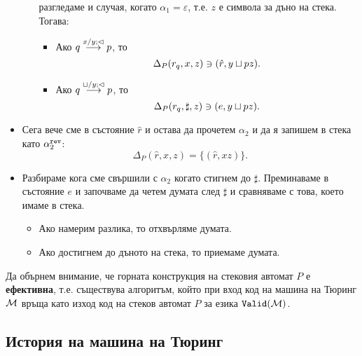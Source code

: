 \begin{hint}
\begin{itemize}
\begin{itemize}
      разгледаме и случая, когато $\alpha_1 = \varepsilon$, т.е. $z$ е символа за дъно на стека. Тогава:
      \begin{itemize}
      \item
        Ако $q \overset{x/y;\lhd}{\longrightarrow} p$, то
        \[\Delta_{P}(r_q,x,z) \ni (\hat{r},y\sqcup pz).\]
      \item
        Ако $q \overset{\sqcup/y;\lhd}{\longrightarrow} p$, то
        \[\Delta_{P}(r_q,\sharp,z) \ni (e,y\sqcup pz).\]
      \end{itemize}
    \end{itemize}
  \item
    Сега вече сме в състояние $\hat{r}$ и остава да прочетем $\alpha_2$ и да я запишем в стека като $\alpha^{\texttt{rev}}_2$:
    \[\Delta_{P}(\hat{r},x,z) = \{(\hat{r}, xz)\}.\]
  \item
    Разбираме кога сме свършили с $\alpha_2$ когато стигнем до $\sharp$. Преминаваме в състояние $e$ и
    започваме да четем думата след $\sharp$ и сравняваме с това, което имаме в стека.
    \begin{itemize}
    \item
      Ако намерим разлика, то отхвърляме думата.
    \item
      Ако достигнем до дъното на стека, то приемаме думата.
    \end{itemize}
  \end{itemize}
\end{hint}

\begin{remark}
  Да обърнем внимание, че горната конструкция на стековия автомат $P$ е {\bf ефективна}, т.е.
  съществува алгоритъм, който при вход код на машина на Тюринг $\mathcal{M}$ връща като изход код на стеков автомат $P$ за езика $\texttt{Valid}(\mathcal{M})$.
\end{remark}

\subsection*{История на машина на Тюринг}

